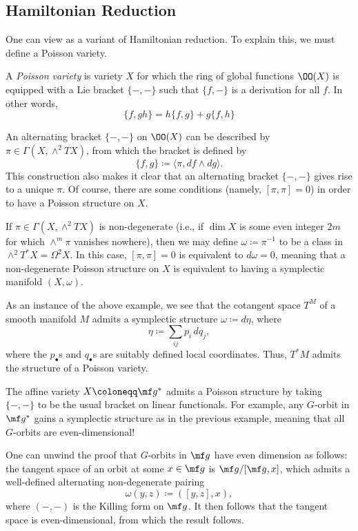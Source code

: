 \documentclass[../notes.tex]{subfiles}
\begin{document}
\subsection{Hamiltonian Reduction}
One can view  as a variant of Hamiltonian reduction. To explain this, we must define a Poisson variety.
\begin{definition}
	A \textit{Poisson variety} is variety $X$ for which the ring of global functions $\OO(X)$ is equipped with a Lie bracket $\{-,-\}$ such that $\{f,-\}$ is a derivation for all $f$. In other words,
	\[\{f,gh\}=h\{f,g\}+g\{f,h\}\]
\end{definition}
\begin{remark}
	An alternating bracket $\{-,-\}$ on $\OO(X)$ can be described by $\pi\in\Gamma\left(X,\land^2TX\right)$, from which the bracket is defined by
	\[\{f,g\}\coloneqq\langle\pi,df\land dg\rangle.\]
	This construction also makes it clear that an alternating bracket $\{-,-\}$ gives rise to a unique $\pi$. Of course, there are some conditions (namely, $[\pi,\pi]=0$) in order to have a Poisson structure on $X$.
\end{remark}
\begin{example}
	If $\pi\in\Gamma\left(X,\land^2TX\right)$ is non-degenerate (i.e., if $\dim X$ is some even integer $2m$ for which $\land^m\pi$ vanishes nowhere), then we may define $\omega\coloneqq\pi^{-1}$ to be a class in $\land^2T^*X=\Omega^2X$. In this case, $[\pi,\pi]=0$ is equivalent to $d\omega=0$, meaning that a non-degenerate Poisson structure on $X$ is equivalent to having a symplectic manifold $(X,\omega)$.
\end{example}
\begin{example}
	As an instance of the above example, we see that the cotangent space $T^M$ of a smooth manifold $M$ admits a symplectic structure $\omega\coloneqq d\eta$, where
	\[\eta\coloneqq\sum_{ij}p_i\,dq_j,\]
	where the $p_\bullet$s and $q_\bullet$s are suitably defined local coordinates. Thus, $T^*M$ admits the structure of a Poisson variety.
\end{example}
\begin{example}
	The affine variety $X\coloneqq\mf g^*$ admits a Poisson structure by taking $\{-,-\}$ to be the usual bracket on linear functionals. For example, any $G$-orbit in $\mf g^*$ gains a symplectic structure as in the previous example, meaning that all $G$-orbits are even-dimensional!
\end{example}
\begin{remark}
	One can unwind the proof that $G$-orbits in $\mf g$ have even dimension as follows: the tangent space of an orbit at some $x\in\mf g$ is $\mf g/[\mf g,x]$, which admits a well-defined alternating non-degenerate pairing
	\[\omega(y,z)\coloneqq([y,z],x),\]
	where $(-,-)$ is the Killing form on $\mf g$. It then follows that the tangent space is even-dimensional, from which the result follows.
\end{remark}
\end{document}
